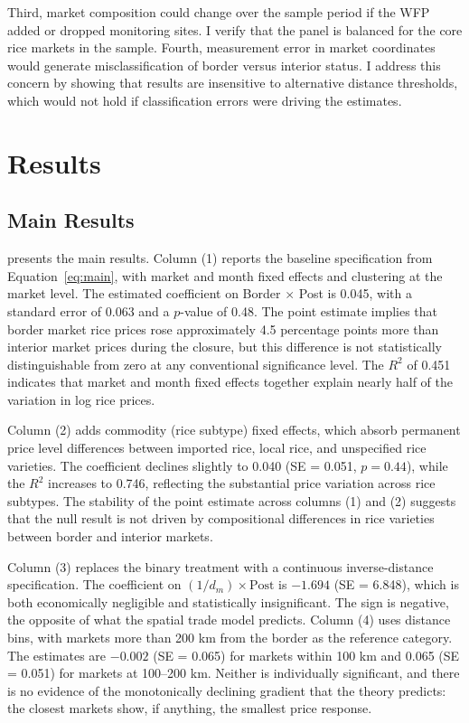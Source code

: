 \documentclass[12pt]{article}
\begin{document}
Third, market composition could change over the sample period if the WFP added or dropped monitoring sites. I verify that the panel is balanced for the core rice markets in the sample. Fourth, measurement error in market coordinates would generate misclassification of border versus interior status. I address this concern by showing that results are insensitive to alternative distance thresholds, which would not hold if classification errors were driving the estimates.


\section{Results}
\label{sec:results}

\subsection{Main Results}

 presents the main results. Column (1) reports the baseline specification from Equation~\ref{eq:main}, with market and month fixed effects and clustering at the market level. The estimated coefficient on Border $\times$ Post is 0.045, with a standard error of 0.063 and a $p$-value of 0.48. The point estimate implies that border market rice prices rose approximately 4.5 percentage points more than interior market prices during the closure, but this difference is not statistically distinguishable from zero at any conventional significance level. The $R^2$ of 0.451 indicates that market and month fixed effects together explain nearly half of the variation in log rice prices.

Column (2) adds commodity (rice subtype) fixed effects, which absorb permanent price level differences between imported rice, local rice, and unspecified rice varieties. The coefficient declines slightly to 0.040 (SE = 0.051, $p = 0.44$), while the $R^2$ increases to 0.746, reflecting the substantial price variation across rice subtypes. The stability of the point estimate across columns (1) and (2) suggests that the null result is not driven by compositional differences in rice varieties between border and interior markets.

Column (3) replaces the binary treatment with a continuous inverse-distance specification. The coefficient on $(1/d_m) \times \text{Post}$ is $-1.694$ (SE = 6.848), which is both economically negligible and statistically insignificant. The sign is negative, the opposite of what the spatial trade model predicts. Column (4) uses distance bins, with markets more than 200 km from the border as the reference category. The estimates are $-0.002$ (SE = 0.065) for markets within 100 km and 0.065 (SE = 0.051) for markets at 100--200 km. Neither is individually significant, and there is no evidence of the monotonically declining gradient that the theory predicts: the closest markets show, if anything, the smallest price response.
\end{document}
